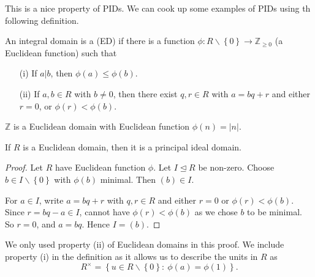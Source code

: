 \documentclass[egregdoesnotlikesansseriftitles,a4paper]{scrartcl}
\begin{document}
This is a nice property of PIDs. We can cook up some examples of PIDs using th following definition. 
\begin{definition*}
      An integral domain is a  (ED) if there is a function $\phi: R\backslash \left\{0\right\} \rightarrow \mathbb{Z}_{\geq 0}$ (a Euclidean function) such that 
      \begin{itemize}
            \item[(i)] If $a|b$, then $\phi (a)\leq \phi (b)$.
            \item[(ii)] If $a,b \in R$ with $b \neq 0$, then there exist $q,r \in R$ with $a=bq+r$ and either $r=0$, or $\phi (r)<\phi (b)$.
      \end{itemize}
      \begin{example*}
            $\mathbb{Z}$ is a Euclidean domain with Euclidean function $\phi (n)=\left|n\right|$.
     \end{example*}
\end{definition*}
\begin{proposition}\label{edimppid}
       If $R$ is a Euclidean domain, then it is a principal ideal domain.
       \begin{proof}
            Let $R$ have Euclidean function $\phi$. Let $I \unlhd R$ be non-zero. Choose $b \in I\backslash \left\{0\right\}$ with $\phi (b)$ minimal. Then $(b)\in I$. 
            
            For $a \in I$, write $a=bq+r $ with $q,r \in R$ and either $r=0$ or $\phi (r)< \phi (b)$. Since $r=bq-a \in I$, cannot have $\phi (r)< \phi (b)$ as we chose $b$ to be minimal. So $r=0$, and $a=bq$. Hence $I= (b)$.
      \end{proof}
      \begin{remark}
            We only used property (ii) of Euclidean domains in this proof. We include property (i) in the definition as it allows us to describe the units in $R$ as \[
            R^{\times }=\left\{u \in R\backslash \left\{0\right\}: \ \phi (a)=\phi (1)\right\}
            .\]
      \end{remark}
\end{proposition}
\end{document}
